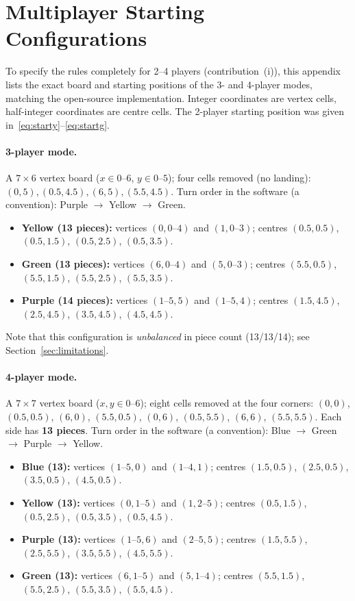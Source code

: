 \section{Multiplayer Starting Configurations}
\label{app:multistart}

To specify the rules completely for 2--4 players (contribution~(i)), this
appendix lists the exact board and starting positions of the 3- and
4-player modes, matching the open-source implementation. Integer coordinates
are vertex cells, half-integer coordinates are centre cells. The 2-player
starting position was given in~\eqref{eq:starty}--\eqref{eq:startg}.

\paragraph{3-player mode.} A $7\times6$ vertex board ($x\in0\text{--}6$,
$y\in0\text{--}5$); four cells removed (no landing):
$(0,5),(0.5,4.5),(6,5),(5.5,4.5)$. Turn order in the software (a convention):
Purple $\to$ Yellow $\to$
Green.
\begin{itemize}[noitemsep,topsep=2pt]
  \item \textbf{Yellow (13 pieces):} vertices $(0,0\text{--}4)$ and
        $(1,0\text{--}3)$; centres $(0.5,0.5)$, $(0.5,1.5)$, $(0.5,2.5)$, $(0.5,3.5)$.
  \item \textbf{Green (13 pieces):} vertices $(6,0\text{--}4)$ and
        $(5,0\text{--}3)$; centres $(5.5,0.5)$, $(5.5,1.5)$, $(5.5,2.5)$, $(5.5,3.5)$.
  \item \textbf{Purple (14 pieces):} vertices $(1\text{--}5,5)$ and
        $(1\text{--}5,4)$; centres $(1.5,4.5)$, $(2.5,4.5)$, $(3.5,4.5)$, $(4.5,4.5)$.
\end{itemize}
Note that this configuration is \emph{unbalanced} in piece count (13/13/14);
see Section~\ref{sec:limitations}.

\paragraph{4-player mode.} A $7\times7$ vertex board ($x,y\in0\text{--}6$);
eight cells removed at the four corners: $(0,0)$, $(0.5,0.5)$, $(6,0)$,
$(5.5,0.5)$, $(0,6)$, $(0.5,5.5)$, $(6,6)$, $(5.5,5.5)$. Each side has
\textbf{13 pieces}. Turn order in the software (a convention):
Blue $\to$ Green $\to$ Purple $\to$ Yellow.
\begin{itemize}[noitemsep,topsep=2pt]
  \item \textbf{Blue (13):} vertices $(1\text{--}5,0)$ and $(1\text{--}4,1)$;
        centres $(1.5,0.5)$, $(2.5,0.5)$, $(3.5,0.5)$, $(4.5,0.5)$.
  \item \textbf{Yellow (13):} vertices $(0,1\text{--}5)$ and $(1,2\text{--}5)$;
        centres $(0.5,1.5)$, $(0.5,2.5)$, $(0.5,3.5)$, $(0.5,4.5)$.
  \item \textbf{Purple (13):} vertices $(1\text{--}5,6)$ and $(2\text{--}5,5)$;
        centres $(1.5,5.5)$, $(2.5,5.5)$, $(3.5,5.5)$, $(4.5,5.5)$.
  \item \textbf{Green (13):} vertices $(6,1\text{--}5)$ and $(5,1\text{--}4)$;
        centres $(5.5,1.5)$, $(5.5,2.5)$, $(5.5,3.5)$, $(5.5,4.5)$.
\end{itemize}
